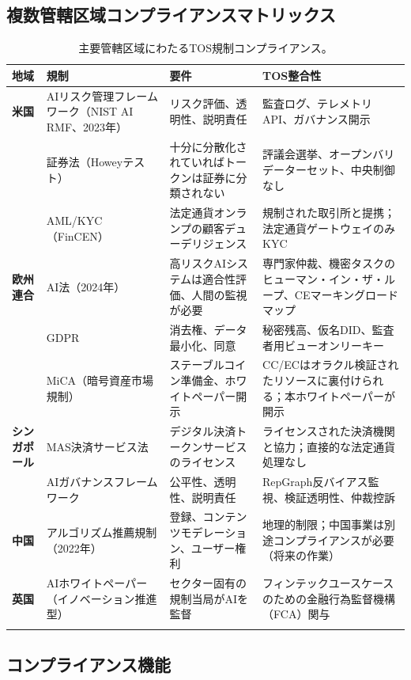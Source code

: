 \documentclass[11pt]{article}
\begin{document}
\subsection{複数管轄区域コンプライアンスマトリックス}

\begin{longtable}{@{}p{}p{}p{}p{}@{}}
\toprule
\textbf{地域} & \textbf{規制} & \textbf{要件} & \textbf{TOS整合性} \\\midrule
\textbf{米国} & AIリスク管理フレームワーク（NIST AI RMF、2023年） & リスク評価、透明性、説明責任 & 監査ログ、テレメトリAPI、ガバナンス開示 \\
 & 証券法（Howeyテスト） & 十分に分散化されていればトークンは証券に分類されない & 評議会選挙、オープンバリデーターセット、中央制御なし \\
 & AML/KYC（FinCEN） & 法定通貨オンランプの顧客デューデリジェンス & 規制された取引所と提携；法定通貨ゲートウェイのみKYC \\
\textbf{欧州連合} & AI法（2024年） & 高リスクAIシステムは適合性評価、人間の監視が必要 & 専門家仲裁、機密タスクのヒューマン・イン・ザ・ループ、CEマーキングロードマップ \\
 & GDPR & 消去権、データ最小化、同意 & 秘密残高、仮名DID、監査者用ビューオンリーキー \\
 & MiCA（暗号資産市場規制） & ステーブルコイン準備金、ホワイトペーパー開示 & CC/ECはオラクル検証されたリソースに裏付けられる；本ホワイトペーパーが開示 \\
\textbf{シンガポール} & MAS決済サービス法 & デジタル決済トークンサービスのライセンス & ライセンスされた決済機関と協力；直接的な法定通貨処理なし \\
 & AIガバナンスフレームワーク & 公平性、透明性、説明責任 & RepGraph反バイアス監視、検証透明性、仲裁控訴 \\
\textbf{中国} & アルゴリズム推薦規制（2022年） & 登録、コンテンツモデレーション、ユーザー権利 & 地理的制限；中国事業は別途コンプライアンスが必要（将来の作業） \\
\textbf{英国} & AIホワイトペーパー（イノベーション推進型） & セクター固有の規制当局がAIを監督 & フィンテックユースケースのための金融行為監督機構（FCA）関与 \\
\bottomrule
\caption{主要管轄区域にわたるTOS規制コンプライアンス。}
\end{longtable}

\subsection{コンプライアンス機能}
\end{document}
